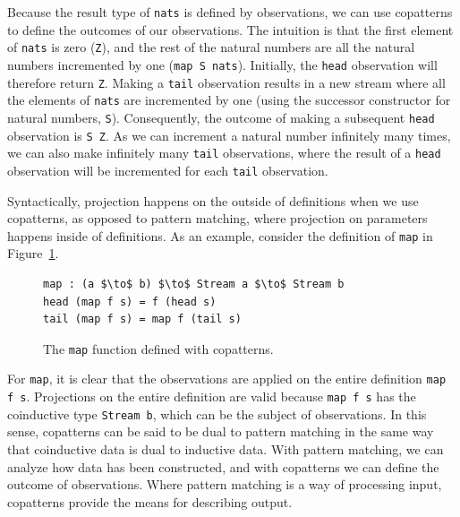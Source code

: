Because the result type of \texttt{nats} is defined by observations, we can use
copatterns to define the outcomes of our observations. The intuition is that the
first element of \texttt{nats} is zero (\texttt{Z}), and the rest of the natural
numbers are all the natural numbers incremented by one (\texttt{map S
  nats}). Initially, the \texttt{head} observation will therefore return
\texttt{Z}. Making a \texttt{tail} observation results in a new stream where all
the elements of \texttt{nats} are incremented by one (using the successor
constructor for natural numbers,  \texttt{S}). Consequently, the outcome of making a
subsequent \texttt{head} observation is \texttt{S Z}. As we can increment a
natural number infinitely many times, we can also make infinitely many
\texttt{tail} observations, where the result of a \texttt{head} observation will
be incremented for each \texttt{tail} observation. 

Syntactically, projection happens on the outside of definitions when we use
copatterns, as opposed to pattern matching, where projection on parameters
happens inside of definitions. As an example, consider the definition of
\texttt{map} in Figure~\ref{fig:map_copatterns}.

\begin{figure}[h]
\begin{lstlisting}[mathescape]
map : (a $\to$ b) $\to$ Stream a $\to$ Stream b
head (map f s) = f (head s)
tail (map f s) = map f (tail s)
\end{lstlisting}
\caption{The \texttt{map} function defined with copatterns.}
\label{fig:map_copatterns}
\end{figure}

For \texttt{map}, it is clear that the observations are applied on the entire
definition \texttt{map f s}. Projections on the entire definition are valid
because \texttt{map f s} has the coinductive type \texttt{Stream b}, which can
be the subject of observations. In this sense, copatterns can be said to be dual
to pattern matching in the same way that coinductive data is dual to inductive
data. With pattern matching, we can analyze how data has been constructed, and
with copatterns we can define the outcome of observations. Where pattern
matching is a way of processing input, copatterns provide the means for
describing output. 



